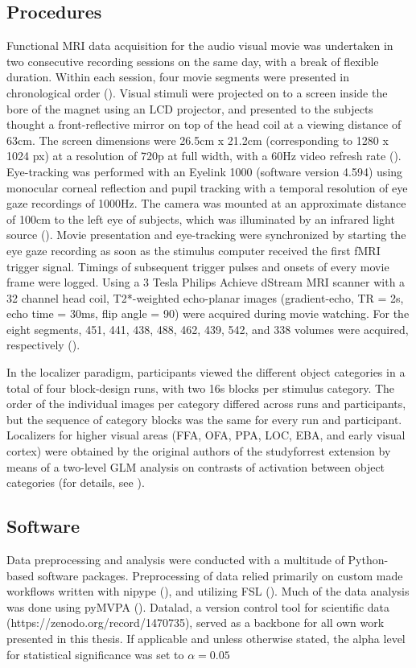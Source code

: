 \documentclass[a4paper, 12pt]{scrreprt}
\begin{document}
{\subsection{Procedures}
Functional MRI data acquisition for the audio visual movie was undertaken in two consecutive recording sessions on the same day, with a break of flexible duration. Within each session, four movie segments were presented in chronological order (\cite{hanke2016studyforrest}). Visual stimuli were projected on to a screen inside the bore of the magnet using an LCD projector, and presented to the subjects thought a front-reflective mirror on top of the head coil at a viewing distance of 63cm. The screen dimensions were 26.5cm x 21.2cm (corresponding to 1280 x 1024 px) at a resolution of 720p at full width, with a 60Hz video refresh rate (\cite{sengupta2016studyforrest}). Eye-tracking was performed with an Eyelink 1000 (software version 4.594) using monocular corneal reflection and pupil tracking with a temporal resolution of eye gaze recordings of 1000Hz. The camera was mounted at an approximate distance of 100cm to the left eye of subjects, which was illuminated
by an infrared light source (\cite{hanke2016studyforrest}). Movie presentation and eye-tracking were synchronized by starting the eye gaze recording as soon as the stimulus computer received the first fMRI trigger signal. Timings of subsequent trigger pulses and onsets of every movie frame
were logged. Using a 3 Tesla Philips Achieve dStream MRI scanner with a 32 channel head coil, T2*-weighted echo-planar images (gradient-echo, TR = 2s, echo time = 30ms, flip angle = 90) were acquired during movie watching. For the eight segments, 451, 441, 438, 488, 462, 439, 542, and 338 volumes were acquired, respectively (\cite{hanke2016studyforrest}).\newline

In the localizer paradigm, participants viewed the different object categories in a total of four block-design runs, with two 16s blocks per stimulus category. The order of the individual images per category differed across runs and participants, but the sequence of category blocks was the same for every run and participant. Localizers for higher visual areas (FFA, OFA, PPA, LOC, EBA, and early visual cortex) were obtained by the original authors of the studyforrest extension by means of a two-level GLM analysis on contrasts of activation between object categories (for details, see \cite{sengupta2016studyforrest}).

\subsection{Software}
Data preprocessing and analysis were conducted with a multitude of Python-based software packages. Preprocessing of data relied primarily on custom made workflows written with nipype (\cite{gorgolewski_krzysztof}), and utilizing FSL (\cite{jenkinson2012fsl}). Much of the data analysis was done using pyMVPA (\cite{hanke2009pymvpa}). Datalad, a version control tool for scientific data (https://zenodo.org/record/1470735), served as a backbone for all own work presented in this thesis. If applicable and unless otherwise stated, the alpha level for statistical significance was set to $\alpha = 0.05$

}
\end{document}

